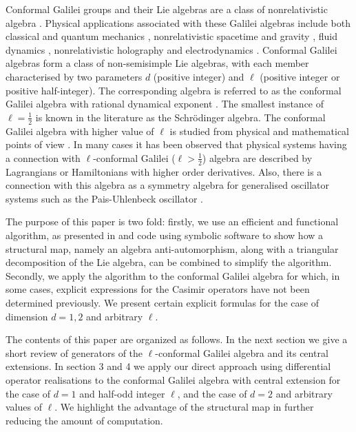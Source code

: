 \documentclass[12pt]{article}
\begin{document}
Conformal Galilei groups and their Lie algebras are a class of nonrelativistic
algebra \cite{Ne97}. Physical applications associated with these
Galilei algebras include both classical and quantum mechanics \cite{Alv07 },
nonrelativistic spacetime and gravity \cite{Bag10,Du09,Ho10} , fluid dynamics
\cite{Zh10}, nonrelativistic holography and electrodynamics  \cite{Ai13, Le73,
Lev71,NeDR97}. Conformal Galilei algebras form a class of non-semisimple Lie
algebras, with each member characterised by two parameters $d$ (positive
integer) and $\ell$ (positive integer or positive
half-integer). The corresponding algebra is referred to as the conformal
Galilei algebra with rational dynamical exponent \cite{Du09,Du11,Ne97,St13}.
The smallest instance of $\ell=\frac{1}{2}$ is known in the literature
\cite{Ni72} as the Schr\"{o}dinger algebra. The conformal Galilei algebra with
higher value of $\ell$ is studied from physical and mathematical points of view
\cite{Ai12, Ai11, Ai13, Ai10, An12, Ba68, Ca09, Du09, Do97,  Mar10,
Ne97,Ni72, Pe77}. In many cases it has been observed that physical systems having a
connection with $\ell$-conformal Galilei ($\ell>\frac{1}{2}$) algebra are
described by Lagrangians or Hamiltonians with higher order derivatives. Also,
there is a connection with this algebra as a symmetry algebra for generalised
oscillator systems such as the Pais-Uhlenbeck oscillator \cite{ An14}.

The purpose of this paper is two fold: firstly, we use an efficient and
functional algorithm, as presented in \cite{Als17} and code using symbolic
software to show how a structural
map, namely an algebra anti-automorphism, along with a triangular decomposition
of the Lie algebra, can be combined to simplify the algorithm.
Secondly, we apply the algorithm to the conformal Galilei algebra for which, in
some cases, explicit expressions for the Casimir operators have not been
determined previously. We present certain
explicit formulas for the case of dimension $d=1,2$ and arbitrary  $\ell$. 

The contents of this paper are organized as follows. In the next section we
give a short review of generators of the $\ell$-conformal Galilei algebra and its
central extensions. In section 3 and 4 we apply our  direct approach
using differential operator realisations to the conformal Galilei algebra with central extension for
the case of $d = 1$ and half-odd integer $\ell$, and the case of $d = 2$ and arbitrary
values of $\ell$. We highlight the advantage of the structural map in further
reducing the amount of computation. 
 
\end{document}
